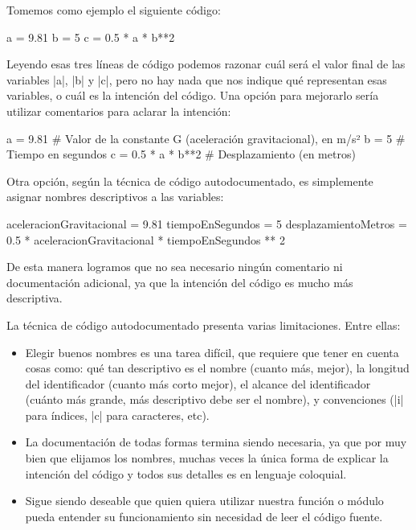 Tomemos como ejemplo el siguiente código:

\begin{codigo-python-sn}
a = 9.81
b = 5
c = 0.5 * a * b**2
\end{codigo-python-sn}

Leyendo esas tres líneas de código podemos razonar cuál será el valor final de
las variables |a|, |b| y |c|, pero no hay nada que nos indique qué representan
esas variables, o cuál es la intención del código. Una opción para mejorarlo sería
utilizar comentarios para aclarar la intención:

\begin{codigo-python-sn}
a = 9.81   # Valor de la constante G (aceleración gravitacional), en m/s²
b = 5      # Tiempo en segundos
c = 0.5 * a * b**2  # Desplazamiento (en metros)
\end{codigo-python-sn}

Otra opción, según la técnica de código autodocumentado, es simplemente asignar
nombres descriptivos a las variables:

\begin{codigo-python-sn}
aceleracionGravitacional = 9.81
tiempoEnSegundos = 5
desplazamientoMetros = 0.5 * aceleracionGravitacional * tiempoEnSegundos ** 2
\end{codigo-python-sn}

De esta manera logramos que no sea necesario ningún comentario ni documentación
adicional, ya que la intención del código es mucho más descriptiva.

La técnica de código autodocumentado presenta varias limitaciones. Entre ellas:

\begin{itemize}
    \item Elegir buenos nombres es una tarea difícil, que
        requiere que tener en cuenta cosas como: qué tan descriptivo es el nombre
        (cuanto más, mejor), la longitud del identificador
        (cuanto más corto mejor), el alcance del identificador (cuánto más
        grande, más descriptivo debe ser el nombre), y convenciones (|i| para
        índices, |c| para caracteres, etc).
    \item La documentación de todas formas termina siendo necesaria, ya que por
        muy bien que elijamos los nombres, muchas veces la única forma de
        explicar la intención del código y todos sus detalles es en lenguaje
        coloquial.
    \item Sigue siendo deseable que quien quiera utilizar nuestra función o
        módulo pueda entender su funcionamiento sin necesidad de leer el código
        fuente.
\end{itemize}

